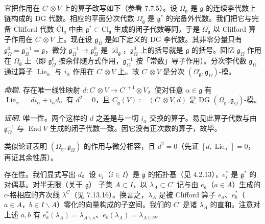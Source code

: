 宜把作用在 $C^{\cdot}\otimes V$ 上的算子改写如下（参看 7.7.5）。设 $\Omega_{\mathfrak{g}}$ 是 $\mathfrak{g}$ 的连续李代数上链构成的 DG 代数。相应的平面分次代数 $\Omega^{\cdot}_{\mathfrak{g}}$ 是 $\mathfrak{g}^{*}$ 的完备外代数。我们把它与完备 Clifford 代数 $\overline{\mathrm{Cl}}_{\mathfrak{g}}$ 中由 $\mathfrak{g}^{*}\subset\mathrm{Cl}_{\mathfrak{g}}$ 生成的闭子代数等同，于是 $\Omega^{\cdot}_{\mathfrak{g}}$ 以 Clifford 算子作用在 $C^{\cdot}\otimes V$ 上。现在设 $\mathfrak{g}_{\Omega}$ 是如下定义的 DG 李代数。其非零分量只有 $\mathfrak{g}^{0}_{\Omega}=\mathfrak{g}^{-1}_{\Omega}=\mathfrak{g}$，微分 $\mathfrak{g}^{-1}_{\Omega}\to\mathfrak{g}^{0}_{\Omega}$ 是 $\operatorname{id}_{\mathfrak{g}}$，$\mathfrak{g}^{0}_{\Omega}$ 上的括号就是 $\mathfrak{g}$ 的括号。回忆 $\mathfrak{g}_{\Omega}$ 作用在 $\Omega_{\mathfrak{g}}$ 上（即 $\mathfrak{g}^{0}_{\Omega}$ 按余伴随方式作用，$\mathfrak{g}^{-1}_{\Omega}$ 按「常数」导子作用）。分次李代数 $\mathfrak{g}^{\cdot}_{\Omega}$ 通过算子 $\operatorname{Lie}_{\alpha}$ 与 $i_{\alpha}$ 作用在 $C^{\cdot}\otimes V$ 上。故 $C^{\cdot}\otimes V$ 是分次 $(\Omega^{\cdot}_{\mathfrak{g}},\mathfrak{g}^{\cdot}_{\Omega})$-模。

 \emph{命题.} 存在唯一线性映射 $d:C^{\cdot}\otimes V\to C^{\cdot+1}\otimes V$，使对任意 $\alpha\in\mathfrak{g}$ 有 $\operatorname{Lie}_{\alpha}=di_{\alpha}+i_{\alpha}d$。有 $d^{2}=0$，且 $C_{\mathfrak{g}}(V):=(C^{\cdot}\otimes V,d)$ 是 DG $(\Omega_{\mathfrak{g}},\mathfrak{g}_{\Omega})$-模。

\emph{证明.} 唯一性。两个这样的 $d$ 之差是与一切 $i_{\alpha}$ 交换的算子。易见此算子代数与由 $\mathfrak{g}^{-1}_{\Omega}$ 与 $\operatorname{End}V$ 生成的闭子代数一致。因它没有正次数的算子，故毕。

类似论证表明 $(\Omega_{\mathfrak{g}},\mathfrak{g}_{\Omega})$ 的作用与微分相容，且 $d^{2}=0$（先证 $[d,\operatorname{Lie}_{\alpha}]=0$，再证其余性质）。

存在性。我们显式写出 $d$。设 $e_{i}$（$i\in I$）是 $\mathfrak{g}$ 的拓扑基（见 4.2.13），$e^{*}_{i}$ 是 $\mathfrak{g}^{*}$ 的对偶基。对半无限（关于 $\mathfrak{g}$）%
子集 $A\subset I$，以 $\lambda_{A}\subset C^{\cdot}$ 记与由 $e_{a}$（$a\in A$）生成的 c-格相应的齐次线 $\lambda^{C}$（见 7.13.16）。换言之，$\lambda_{A}$ 是被 Clifford 算子 $e_{a}$、$e^{*}_{b}$（$a\in A$，$b\in I\backslash A$）零化的向量构成的子空间。我们的 $C^{\cdot}$ 是诸 $\lambda_{A}$ 的直和。注意对上述 $a,b$ 有 $e^{*}_{a}(\lambda_{A})=\lambda_{A\backslash a}$、$e_{b}(\lambda_{A})=\lambda_{A\cup b}$。

